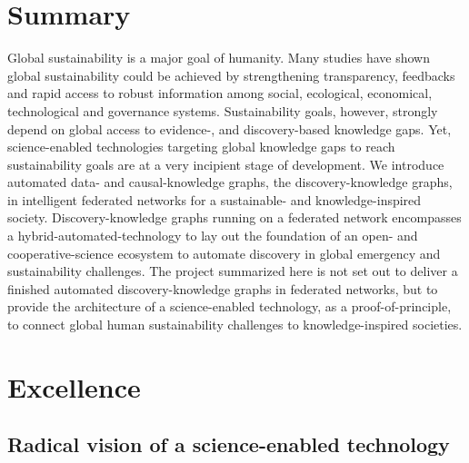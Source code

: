 \documentclass[12pt, a4paper]{article} %
\begin{document}
\section*{{\bf Summary}} Global sustainability is a major goal of
humanity. Many studies have shown global sustainability could be
achieved by strengthening transparency, feedbacks and rapid access to
robust information among social, ecological, economical, technological
and governance systems. Sustainability goals, however, strongly depend
on global access to evidence-, and discovery-based knowledge
gaps. Yet, science-enabled technologies targeting global knowledge
gaps to reach sustainability goals are at a very incipient stage of
development. We introduce automated data- and causal-knowledge graphs,
the discovery-knowledge graphs, in intelligent federated networks for
a sustainable- and knowledge-inspired society. Discovery-knowledge
graphs running on a federated network encompasses a
hybrid-automated-technology to lay out the foundation of an open- and
cooperative-science ecosystem to automate discovery in global
emergency and sustainability challenges. The project summarized here
is not set out to deliver a finished automated discovery-knowledge
graphs in federated networks, but to provide the architecture of a
science-enabled technology, as a proof-of-principle, to connect global
human sustainability challenges to knowledge-inspired societies.
\section{Excellence}
\subsection{Radical vision of a science-enabled technology}
\end{document}
